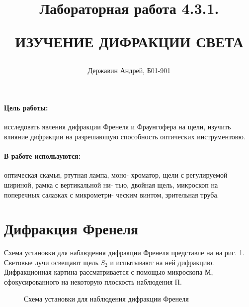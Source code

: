\documentclass[a5paper,10pt, twoside]{article} %
\title
{
	\hfill \break	\hfill \break
	\hfill \break	\hfill \break
  \hfill \break	\hfill \break
	Лабораторная работа 4.3.1.
	
	ИЗУЧЕНИЕ ДИФРАКЦИИ СВЕТА
}
\author{Державин Андрей, Б01-901}
\begin{document}
	
\maketitle


\thispagestyle{empty} %

\newpage

\tableofcontents %

\newpage


\paragraph{Цель работы:}

	исследовать явления дифракции Френеля и Фраунгофера на щели, изучить влияние дифракции на 
	разрешающую способность оптических инструментовю.

\paragraph{В работе используются:}

	оптическая скамья, ртутная лампа, моно-
	хроматор, щели с регулируемой шириной, рамка с вертикальной ни-
	тью, двойная щель, микроскоп на поперечных салазках с микрометри-
	ческим винтом, зрительная труба.


\section{Дифракция Френеля}
	Схема установки для наблюдения дифракции Френеля представле на на рис. \ref{img:scheme0}.
	Световые лучи освещают щель $S_2$ и испытывают на ней дифракцию. Дифракционная картина
	рассматривается с помощью микроскопа $\text{М}$, сфокусированного на некоторую плоскость
	наблюдения $\text{П}$.

	\begin{figure}[h]
		\caption{Схема установки для наблюдения дифракции Френеля}
		\label{img:scheme0}
	\end{figure}
\end{document}
